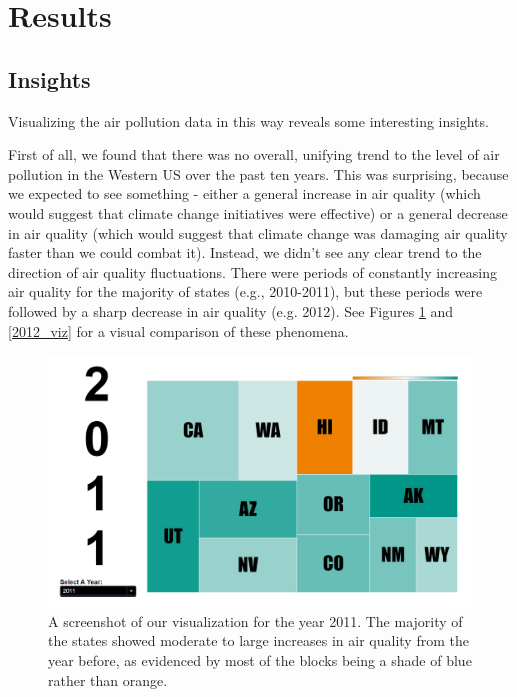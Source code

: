 \documentclass[journal]{vgtc}                %
\begin{document}
\section{Results}

\subsection{Insights}

Visualizing the air pollution data in this way reveals some interesting insights.

First of all, we found that there was no overall, unifying trend to the level of air pollution in the Western US
over the past ten years. This was surprising, because we expected to see something - either a general increase in air quality
(which would suggest that climate change initiatives were effective) or a general decrease in air quality (which
would suggest that climate change was damaging air quality faster than we could combat it). Instead, we didn't see any clear 
trend to the direction of air quality fluctuations. There were periods of constantly increasing air quality for the majority 
of states (e.g., 2010-2011), but these periods were followed by a sharp decrease in air quality (e.g. 2012). See Figures \ref{fig:2011_viz}
and \ref{2012_viz} for a visual comparison of these phenomena.

\begin{figure}
   \includegraphics[width=\columnwidth]{2011_viz.png}
   \caption{A screenshot of our visualization for the year 2011. The majority of the states showed moderate to large increases
   in air quality from the year before, as evidenced by most of the blocks being a shade of blue rather than orange. \label{fig:2011_viz}}
\end{figure}
\end{document}
